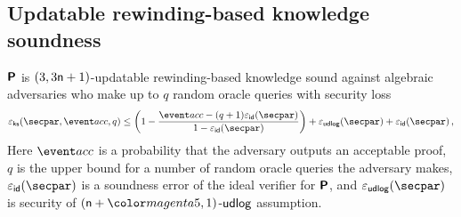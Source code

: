 \subsection{Updatable rewinding-based knowledge soundness}
\begin{lemma}
	\label{lem:plonkprot_ss}
  $\bm{\mathsf{P}}$ is $(3, 3 \mathsf{n} + 1)$-updatable rewinding-based knowledge sound against algebraic adversaries who make up to $q$ random oracle queries with security loss 
  \[
    \epscss(\secpar,\accProb, q) \leq \left(1 - \frac{\accProb - (q + 1) \epsid (\secpar)}{1 - \epsid (\secpar)}\right) + \epsudlog (\secpar) + \epsid (\secpar)\,,
  \]
	Here $\accProb$ is a probability that the adversary outputs an acceptable proof, $q$ is the upper bound for a number of random oracle queries the adversary makes, $\epsid(\secpar)$ is a soundness error of the ideal verifier for $\bm{\mathsf{P}}$, and $\epsudlog(\secpar)$ is security of $(\numberofconstrains + \changedm{5}, 1)$-$\mathsf{udlog}$ 
	assumption.
\end{lemma}


